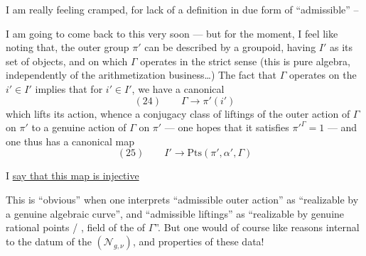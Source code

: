 
 I am really feeling
cramped, for lack of a
definition in due form of ``admissible'' --



I am going to come back to this very soon --- but
for the moment, I feel like noting that,
the outer group $\pi'$ can be described by
a  groupoid, having $I'$ as its set
of objects, and on which $\Gamma$ operates in
the strict sense (this is pure algebra,
independently of the arithmetization business\ldots)
The fact that $\Gamma$ operates 
on the $i'\in I'$ implies that for 
$i'\in I'$, we have a 
canonical 
\[
(24)\qquad \Gamma\longrightarrow\pi'(i')
\]
which lifts its  action, whence
a  conjugacy class of liftings
of the outer action of $\Gamma$ on $\pi'$
to a genuine action of $\Gamma$ on $\pi'$
--- one hopes that it satisfies ${\pi'}^{\Gamma}=1$ ---
and one thus has a canonical map
\[
(25)\qquad I'\longrightarrow\mathrm{Pts}(\pi',\alpha',\Gamma)
\]



I \uline{say that this map is injective}

This is ``obvious'' when one interprets
``admissible outer action'' as ``realizable
by a genuine algebraic curve'', and
``admissible liftings'' as ``realizable
by genuine rational points / , field of
the  of $\Gamma$''. But one would
of course like reasons internal to
the datum of the $(\mathcal N_{g,\nu})$, and \unsure{)}
properties of these data! 


